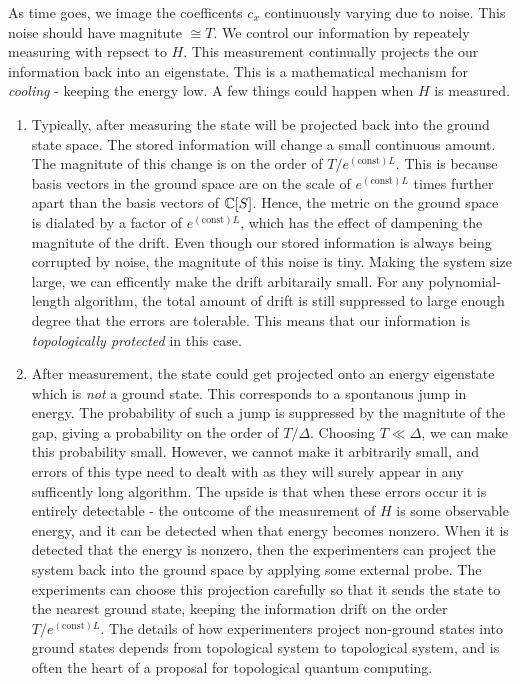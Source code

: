 As time goes, we image the coefficents $c_x$ continuously varying due to noise. This noise should have magnitute $\cong T$. We control our information by repeately measuring with repsect to $H$. This measurement continually projects the our information back into an eigenstate. This is a mathematical mechanism for \textit{cooling} - keeping the energy low. A few things could happen when $H$ is measured.

\begin{enumerate}
\item Typically, after measuring the state will be projected back into the ground state space. The stored information will change a small continuous amount. The magnitute of this change is on the order of $T/e^{(\text{const})L}$. This is because basis vectors in the ground space are on the scale of $e^{(\text{const})L}$ times further apart than the basis vectors of $\mathbb{C}[S]$. Hence, the metric on the ground space is dialated by a factor of $e^{(\text{const})L}$, which has the effect of dampening the magnitute of the drift. Even though our stored information is always being corrupted by noise, the magnitute of this noise is tiny. Making the system size large, we can efficently make the drift arbitaraily small. For any polynomial-length algorithm, the total amount of drift is still suppressed to large enough degree that the errors are tolerable. This means that our information is \textit{topologically protected} in this case.

\item After measurement, the state could get projected onto an energy eigenstate which is \textit{not} a ground state. This corresponds to a spontanous jump in energy. The probability of such a jump is suppressed by the magnitute of the gap, giving a probability on the order of $T/\Delta$. Choosing $T\ll \Delta$, we can make this probability small. However, we cannot make it arbitrarily small, and errors of this type need to dealt with as they will surely appear in any sufficently long algorithm. The upside is that when these errors occur it is entirely detectable - the outcome of the measurement of $H$ is some observable energy, and it can be detected when that energy becomes nonzero. When it is detected that the energy is nonzero, then the experimenters can project the system back into the ground space by applying some external probe. The experiments can choose this projection carefully so that it sends the state to the nearest ground state, keeping the information drift on the order $T/e^{(\text{const})L}$. The details of how experimenters project non-ground states into ground states depends from topological system to topological system, and is often the heart of a proposal for topological quantum computing.
\end{enumerate}

